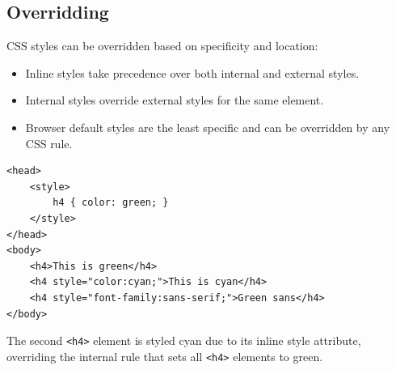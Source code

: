 \subsection*{Overridding}
CSS styles can be overridden based on specificity and location:
\begin{itemize}
    \item Inline styles take precedence over both internal and external styles.
    \item Internal styles override external styles for the same element.
    \item Browser default styles are the least specific and can be overridden by any CSS rule.
\end{itemize}
\begin{verbatim}
<head>
    <style>
        h4 { color: green; }
    </style>
</head>
<body>
    <h4>This is green</h4>
    <h4 style="color:cyan;">This is cyan</h4>
    <h4 style="font-family:sans-serif;">Green sans</h4>
</body>
\end{verbatim}
The second \texttt{<h4>} element is styled cyan due to its inline style attribute, overriding the internal rule that sets all \texttt{<h4>} elements to green.

